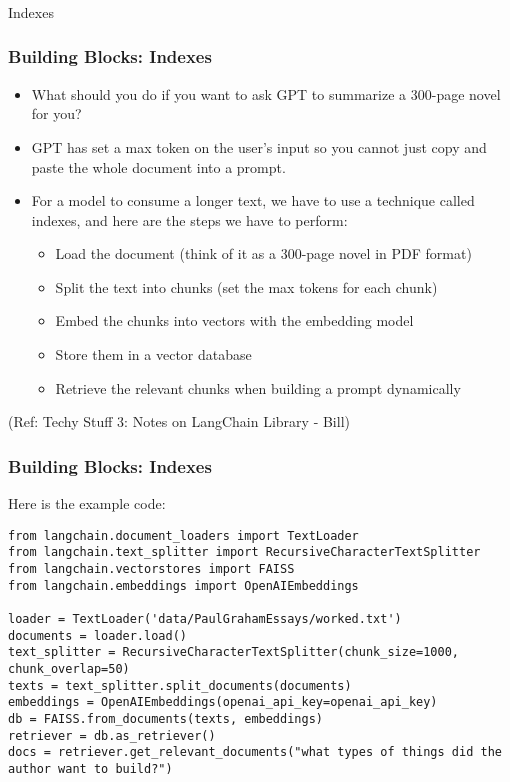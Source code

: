 \begin{frame}[fragile]\frametitle{}
\begin{center}
{\Large Indexes}
\end{center}
\end{frame}

\begin{frame}[fragile]\frametitle{Building Blocks: Indexes}

\begin{itemize}
\item What should you do if you want to ask GPT to summarize a 300-page novel for you? 
\item GPT has set a max token on the user’s input so you cannot just copy and paste the whole document into a prompt. 
\item For a model to consume a longer text, we have to use a technique called indexes, and here are the steps we have to perform:
\begin{itemize}
\item Load the document (think of it as a 300-page novel in PDF format)
\item Split the text into chunks (set the max tokens for each chunk)
\item Embed the chunks into vectors with the embedding model
\item Store them in a vector database
\item Retrieve the relevant chunks when building a prompt dynamically
\end{itemize}
\end{itemize}

{\tiny (Ref: Techy Stuff 3: Notes on LangChain Library - Bill)}

\end{frame}

\begin{frame}[fragile]\frametitle{Building Blocks: Indexes}

Here is the example code:


\begin{lstlisting}
from langchain.document_loaders import TextLoader
from langchain.text_splitter import RecursiveCharacterTextSplitter
from langchain.vectorstores import FAISS
from langchain.embeddings import OpenAIEmbeddings

loader = TextLoader('data/PaulGrahamEssays/worked.txt')
documents = loader.load()
text_splitter = RecursiveCharacterTextSplitter(chunk_size=1000, chunk_overlap=50)
texts = text_splitter.split_documents(documents)
embeddings = OpenAIEmbeddings(openai_api_key=openai_api_key)
db = FAISS.from_documents(texts, embeddings)
retriever = db.as_retriever()
docs = retriever.get_relevant_documents("what types of things did the author want to build?")
\end{lstlisting}	  
\end{frame}

